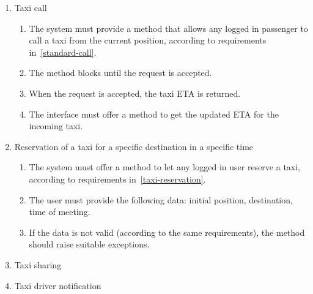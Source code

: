\begin{enumerate}
\begin{enumerate}
\end{enumerate}
\item Taxi call
\begin{enumerate}
    \item The system must provide a method that allows any logged in passenger to call a taxi from the current position, according to requirements in~\autoref{standard-call}.
    \item The method blocks until the request is accepted.
    \item When the request is accepted, the taxi ETA is returned.
    \item The interface must offer a method to get the updated ETA for the incoming taxi.
\end{enumerate}

\item Reservation of a taxi for a specific destination in a specific time
\begin{enumerate}
    \item The system must offer a method to let any logged in user reserve a taxi, according to requirements in~\autoref{taxi-reservation}.
    \item The user must provide the following data: initial position, destination, time of meeting.
    \item If the data is not valid (according to the same requirements), the method should raise suitable exceptions.
\end{enumerate}

\item Taxi sharing
\item Taxi driver notification

\end{enumerate}
